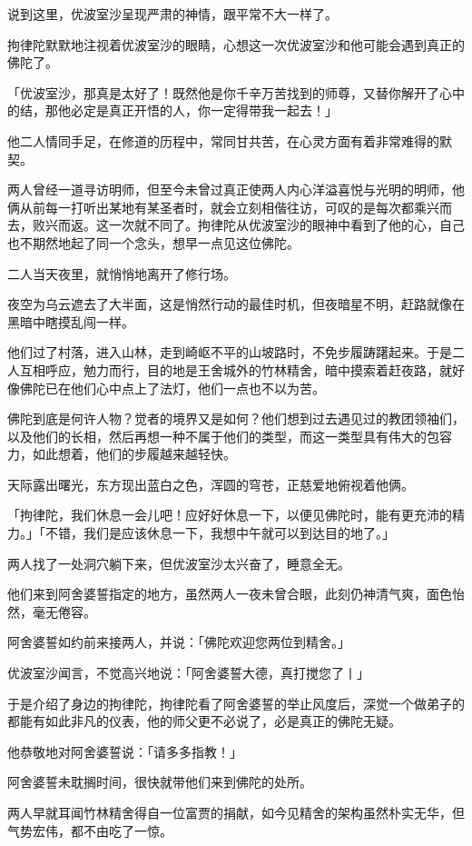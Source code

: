 \documentclass[12pt,twoside,openany]{book}
\begin{document}
说到这里，优波室沙呈现严肃的神情，跟平常不大一样了。

拘律陀默默地注视着优波室沙的眼睛，心想这一次优波室沙和他可能会遇到真正的佛陀了。

「优波室沙，那真是太好了！既然他是你千辛万苦找到的师尊，又替你解开了心中的结，那他必定是真正开悟的人，你一定得带我一起去！」

他二人情同手足，在修道的历程中，常同甘共苦，在心灵方面有着非常难得的默契。

两人曾经一道寻访明师，但至今未曾过真正使两人内心洋溢喜悦与光明的明师，他俩从前每一打听出某地有某圣者时，就会立刻相偕往访，可叹的是每次都乘兴而去，败兴而返。这一次就不同了。拘律陀从优波室沙的眼神中看到了他的心，自己也不期然地起了同一个念头，想早一点见这位佛陀。

二人当天夜里，就悄悄地离开了修行场。

夜空为乌云遮去了大半面，这是悄然行动的最佳时机，但夜暗星不明，赶路就像在黑暗中瞎摸乱闯一样。

他们过了村落，进入山林，走到崎岖不平的山坡路时，不免步履踌躇起来。于是二人互相呼应，勉力而行，目的地是王舍城外的竹林精舍，暗中摸索着赶夜路，就好像佛陀已在他们心中点上了法灯，他们一点也不以为苦。

佛陀到底是何许人物？觉者的境界又是如何？他们想到过去遇见过的教团领袖们，以及他们的长相，然后再想一种不属于他们的类型，而这一类型具有伟大的包容力，如此想着，他们的步履越来越轻快。

天际露出曙光，东方现出蓝白之色，浑圆的穹苍，正慈爱地俯视着他俩。

「拘律陀，我们休息一会儿吧！应好好休息一下，以便见佛陀时，能有更充沛的精力。」「不错，我们是应该休息一下，我想中午就可以到达目的地了。」

两人找了一处洞穴躺下来，但优波室沙太兴奋了，睡意全无。

他们来到阿舍婆誓指定的地方，虽然两人一夜未曾合眼，此刻仍神清气爽，面色怡然，毫无倦容。

阿舍婆誓如约前来接两人，并说：「佛陀欢迎您两位到精舍。」

优波室沙闻言，不觉高兴地说：「阿舍婆誓大德，真打搅您了丨」

于是介绍了身边的拘律陀，拘律陀看了阿舍婆誓的举止风度后，深觉一个做弟子的都能有如此非凡的仪表，他的师父更不必说了，必是真正的佛陀无疑。

他恭敬地对阿舍婆誓说：「请多多指教！」

阿舍婆誓未耽搁时间，很快就带他们来到佛陀的处所。

两人早就耳闻竹林精舍得自一位富贾的捐献，如今见精舍的架构虽然朴实无华，但气势宏伟，都不由吃了一惊。
\end{document}
